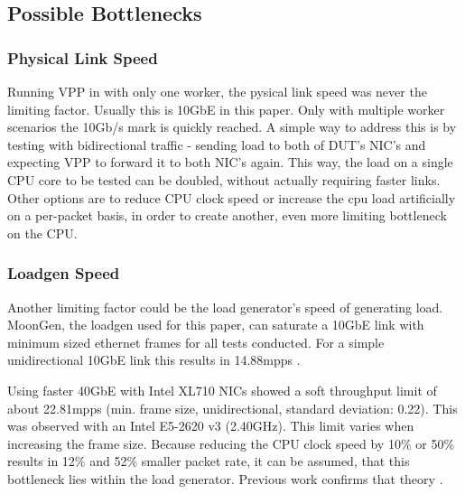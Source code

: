\subsection{Possible Bottlenecks}

\subsubsection{Physical Link Speed}
\label{sec:linkspeed}


Running VPP in with only one worker, the pysical link speed was never
the limiting factor. Usually this is 10GbE in this paper. Only with
multiple worker scenarios the 10Gb/s mark is quickly reached. A simple
way to address this is by testing with bidirectional traffic - sending
load to both of DUT's NIC's and expecting VPP to forward it to both
NIC's again. This way, the load on a single CPU core to be tested can
be doubled, without actually requiring faster links. Other options are
to reduce CPU clock speed or increase the cpu load artificially on a
per-packet basis, in order to create another, even more limiting
bottleneck on the CPU.


\subsubsection{Loadgen Speed}


Another limiting factor could be the load generator's speed of
generating load. MoonGen, the loadgen used for this paper, can
saturate a 10GbE link with minimum sized ethernet frames for all tests
conducted. For a simple unidirectional 10GbE link this results in
14.88mpps \cite{emmerich2015assessing}.


Using faster 40GbE with Intel XL710 NICs showed a soft throughput
limit of about 22.81mpps (min. frame size, unidirectional, standard
deviation: 0.22). This was observed with an Intel E5-2620 v3
(2.40GHz). This limit varies when increasing the frame size. Because
reducing the CPU clock speed by 10\% or 50\% results in 12\% and 52\%
smaller packet rate, it can be assumed, that this bottleneck lies
within the load generator. Previous work confirms that theory
\cite{emmerich2015moongen}.

